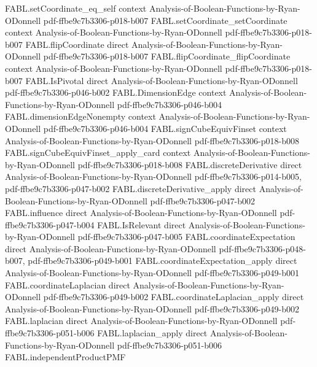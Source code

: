 \begin{theorem}
  {FABL.setCoordinate_eq_self}
  {context}
  {Analysis-of-Boolean-Functions-by-Ryan-ODonnell}
  {pdf-ffbe9c7b3306-p018-b007}
\proofstep
  {FABL.setCoordinate_setCoordinate}
  {context}
  {Analysis-of-Boolean-Functions-by-Ryan-ODonnell}
  {pdf-ffbe9c7b3306-p018-b007}
\proofstep
  {FABL.flipCoordinate}
  {direct}
  {Analysis-of-Boolean-Functions-by-Ryan-ODonnell}
  {pdf-ffbe9c7b3306-p018-b007}
\proofstep
  {FABL.flipCoordinate_flipCoordinate}
  {context}
  {Analysis-of-Boolean-Functions-by-Ryan-ODonnell}
  {pdf-ffbe9c7b3306-p018-b007}
\proofstep
  {FABL.IsPivotal}
  {direct}
  {Analysis-of-Boolean-Functions-by-Ryan-ODonnell}
  {pdf-ffbe9c7b3306-p046-b002}
\proofstep
  {FABL.DimensionEdge}
  {context}
  {Analysis-of-Boolean-Functions-by-Ryan-ODonnell}
  {pdf-ffbe9c7b3306-p046-b004}
\proofstep
  {FABL.dimensionEdgeNonempty}
  {context}
  {Analysis-of-Boolean-Functions-by-Ryan-ODonnell}
  {pdf-ffbe9c7b3306-p046-b004}
\proofstep
  {FABL.signCubeEquivFinset}
  {context}
  {Analysis-of-Boolean-Functions-by-Ryan-ODonnell}
  {pdf-ffbe9c7b3306-p018-b008}
\proofstep
  {FABL.signCubeEquivFinset_apply_card}
  {context}
  {Analysis-of-Boolean-Functions-by-Ryan-ODonnell}
  {pdf-ffbe9c7b3306-p018-b008}
\proofstep
  {FABL.discreteDerivative}
  {direct}
  {Analysis-of-Boolean-Functions-by-Ryan-ODonnell}
  {pdf-ffbe9c7b3306-p014-b005,
    pdf-ffbe9c7b3306-p047-b002}
\proofstep
  {FABL.discreteDerivative_apply}
  {direct}
  {Analysis-of-Boolean-Functions-by-Ryan-ODonnell}
  {pdf-ffbe9c7b3306-p047-b002}
\proofstep
  {FABL.influence}
  {direct}
  {Analysis-of-Boolean-Functions-by-Ryan-ODonnell}
  {pdf-ffbe9c7b3306-p047-b004}
\proofstep
  {FABL.IsRelevant}
  {direct}
  {Analysis-of-Boolean-Functions-by-Ryan-ODonnell}
  {pdf-ffbe9c7b3306-p047-b005}
\proofstep
  {FABL.coordinateExpectation}
  {direct}
  {Analysis-of-Boolean-Functions-by-Ryan-ODonnell}
  {pdf-ffbe9c7b3306-p048-b007,
    pdf-ffbe9c7b3306-p049-b001}
\proofstep
  {FABL.coordinateExpectation_apply}
  {direct}
  {Analysis-of-Boolean-Functions-by-Ryan-ODonnell}
  {pdf-ffbe9c7b3306-p049-b001}
\proofstep
  {FABL.coordinateLaplacian}
  {direct}
  {Analysis-of-Boolean-Functions-by-Ryan-ODonnell}
  {pdf-ffbe9c7b3306-p049-b002}
\proofstep
  {FABL.coordinateLaplacian_apply}
  {direct}
  {Analysis-of-Boolean-Functions-by-Ryan-ODonnell}
  {pdf-ffbe9c7b3306-p049-b002}
\proofstep
  {FABL.laplacian}
  {direct}
  {Analysis-of-Boolean-Functions-by-Ryan-ODonnell}
  {pdf-ffbe9c7b3306-p051-b006}
\proofstep
  {FABL.laplacian_apply}
  {direct}
  {Analysis-of-Boolean-Functions-by-Ryan-ODonnell}
  {pdf-ffbe9c7b3306-p051-b006}
\proofstep
  {FABL.independentProductPMF}

\end{theorem}
